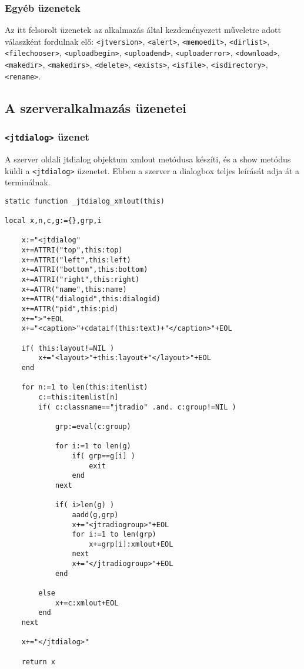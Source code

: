 \subsubsection{Egyéb üzenetek}
Az itt felsorolt üzenetek az alkalmazás által kezdeményezett
műveletre adott válaszként fordulnak elő:
\verb!<jtversion>!,
\verb!<alert>!, 
\verb!<memoedit>!, 
\verb!<dirlist>!, 
\verb!<filechooser>!, 
\verb!<uploadbegin>!, 
\verb!<uploadend>!, 
\verb!<uploaderror>!, 
\verb!<download>!, 
\verb!<makedir>!, 
\verb!<makedirs>!, 
\verb!<delete>!, 
\verb!<exists>!, 
\verb!<isfile>!, 
\verb!<isdirectory>!, 
\verb!<rename>!.



\subsection{A szerveralkalmazás üzenetei}

\subsubsection{{\tt<jtdialog>} üzenet}

A szerver oldali jtdialog objektum xmlout metódusa készíti,
és a show metódus küldi a {\tt<jtdialog>} üzenetet. Ebben a 
szerver a dialogbox teljes leírását adja át a terminálnak.
 
\begin{verbatim}
static function _jtdialog_xmlout(this)

local x,n,c,g:={},grp,i

    x:="<jtdialog"
    x+=ATTRI("top",this:top)
    x+=ATTRI("left",this:left)
    x+=ATTRI("bottom",this:bottom)
    x+=ATTRI("right",this:right)
    x+=ATTR("name",this:name)
    x+=ATTR("dialogid",this:dialogid)
    x+=ATTR("pid",this:pid)
    x+=">"+EOL
    x+="<caption>"+cdataif(this:text)+"</caption>"+EOL
 
    if( this:layout!=NIL )
        x+="<layout>"+this:layout+"</layout>"+EOL
    end

    for n:=1 to len(this:itemlist)
        c:=this:itemlist[n] 
        if( c:classname=="jtradio" .and. c:group!=NIL )
        
            grp:=eval(c:group)

            for i:=1 to len(g)
                if( grp==g[i] )
                    exit
                end
            next

            if( i>len(g) )
                aadd(g,grp)
                x+="<jtradiogroup>"+EOL
                for i:=1 to len(grp)
                    x+=grp[i]:xmlout+EOL
                next
                x+="</jtradiogroup>"+EOL
            end

        else
            x+=c:xmlout+EOL
        end
    next

    x+="</jtdialog>"

    return x
\end{verbatim}

